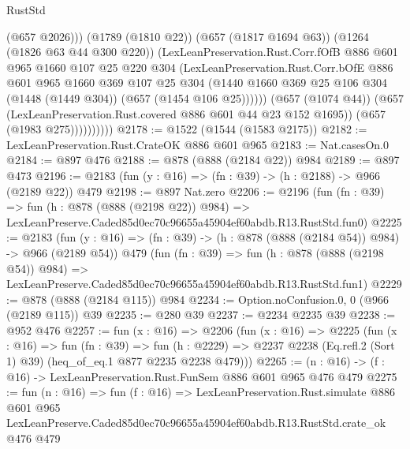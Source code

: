 \begin{lexlean}{RustStd}
\begin{coremodule}
                          (@657 @2026)))
                      (@1789 (@1810 @22))
                      (@657 (@1817 @1694 @63))
                      (@1264 (@1826 @63 @44 @300 @220))
                      (LexLeanPreservation.Rust.Corr.fOfB
                        @886
                        @601
                        @965
                        @1660
                        @107
                        @25
                        @220
                        @304
                        (LexLeanPreservation.Rust.Corr.bOfE
                          @886
                          @601
                          @965
                          @1660
                          @369
                          @107
                          @25
                          @304
                          (@1440
                            @1660
                            @369
                            @25
                            @106
                            @304
                            (@1448 (@1449 @304))
                            (@657 (@1454 @106 @25))))))
                    (@657 (@1074 @44))
                    (@657 (LexLeanPreservation.Rust.covered @886 @601 @44 @23 @152 @1695))
                    (@657 (@1983 @275))))))))))
@2178 := @1522 (@1544 (@1583 @2175))
@2182 := LexLeanPreservation.Rust.CrateOK @886 @601 @965
@2183 := Nat.casesOn.{0}
@2184 := @897 @476
@2188 := @878 (@888 (@2184 @22)) @984
@2189 := @897 @473
@2196 := @2183 (fun (y : @16) => (fn : @39) -> (h : @2188) -> @966 (@2189 @22)) @479
@2198 := @897 Nat.zero
@2206 := @2196
    (fun (fn : @39) =>
    fun (h : @878 (@888 (@2198 @22)) @984) =>
    LexLeanPreserve.Caded85d0ec70c96655a45904ef60abdb.R13.RustStd.fun0)
@2225 := @2183
    (fun (y : @16) => (fn : @39) -> (h : @878 (@888 (@2184 @54)) @984) -> @966 (@2189 @54))
    @479
    (fun (fn : @39) =>
    fun (h : @878 (@888 (@2198 @54)) @984) =>
    LexLeanPreserve.Caded85d0ec70c96655a45904ef60abdb.R13.RustStd.fun1)
@2229 := @878 (@888 (@2184 @115)) @984
@2234 := Option.noConfusion.{0, 0} (@966 (@2189 @115)) @39
@2235 := @280 @39
@2237 := @2234 @2235 @39
@2238 := @952 @476
@2257 := fun (x : @16) =>
  @2206
    (fun (x : @16) =>
    @2225
      (fun (x : @16) =>
      fun (fn : @39) =>
      fun (h : @2229) =>
      @2237 @2238 (Eq.refl.{2} (Sort 1) @39) (heq_of_eq.{1} @877 @2235 @2238 @479)))
@2265 := (n : @16) -> (f : @16) -> LexLeanPreservation.Rust.FunSem @886 @601 @965 @476 @479
@2275 := fun (n : @16) =>
  fun (f : @16) =>
  LexLeanPreservation.Rust.simulate
    @886
    @601
    @965
    LexLeanPreserve.Caded85d0ec70c96655a45904ef60abdb.R13.RustStd.crate_ok
    @476
    @479
\end{coremodule}
\end{lexlean}
